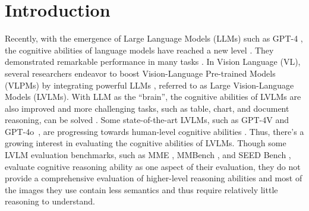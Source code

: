 \section{Introduction}
\label{sec:intro}



Recently, with the emergence of Large Language Models (LLMs) such as GPT-4 \cite{openai2023gpt4}, the cognitive abilities of language models have reached a new level \cite{zhuang2023efficiently}.
They demonstrated remarkable performance in many tasks \cite{bubeck2023sparks}.
In Vision Language (VL), several researchers \cite{zhu2023minigpt, liu2023llava, ye2023mplug} endeavor to boost Vision-Language Pre-trained Models (VLPMs) by integrating powerful LLMs \cite{touvron2023llama, chiang2023vicuna}, referred to as Large Vision-Language Models (LVLMs).
With LLM as the ``brain'', the cognitive abilities of LVLMs are also improved and more challenging tasks, such as table, chart, and document reasoning, can be solved \cite{yang2023dawn}. 
Some state-of-the-art LVLMs, such as GPT-4V and GPT-4o~\cite{openai2023gpt4}, 
are progressing towards human-level cognitive abilities \cite{yang2023dawn}.
Thus, there's a growing interest in evaluating the cognitive abilities of LVLMs.
Though some LVLM evaluation benchmarks, such as MME \cite{fu2023mme}, MMBench \cite{liu2023mmbench}, and SEED Bench \cite{li2023seed}, 
evaluate cognitive reasoning ability as one aspect of their evaluation, they do not provide a comprehensive evaluation of higher-level reasoning abilities and most of the images they use contain less semantics and thus require relatively little reasoning to understand. 
